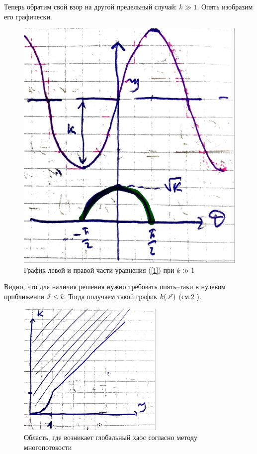 \documentclass[a4paper,9pt,russian]{article}
\newcommand{\I}{\mathscr{I}}
\renewcommand{\-}{\bar}
\begin{document}
\par
Теперь обратим свой взор на другой предельный случай: $k \gg 1$. Опять изобразим его графически.
\begin{figure}[h]
 \centering
 \includegraphics[width = 70 mm]{graf/graf2.JPG}
 \caption{График левой и правой части уравнения (\ref{1}) при $k \gg 1$}
 \label{graf}
\end{figure}
\par
Видно, что для наличия решения нужно требовать опять--таки в нулевом приближении $\I \le k$. Тогда получаем такой график $k \qty(\I)$ (см.\ref{graf3} ).
\begin{figure}
 \centering
 \includegraphics[width = 70mm]{graf/graf3.JPG}
 \caption{Область, где возникает глобальный хаос согласно методу многопотокости}
 \label{graf3}
\end{figure}
\end{document}
